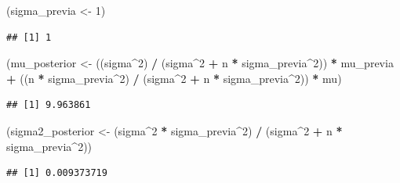 \documentclass[
  12pt,
]{book}
\newenvironment{Shaded}{\begin{snugshade}}{\end{snugshade}}
\newcommand{\DecValTok}[1]{\textcolor[rgb]{0.00,0.00,0.81}{#1}}
\newcommand{\NormalTok}[1]{#1}
\newcommand{\OperatorTok}[1]{\textcolor[rgb]{0.81,0.36,0.00}{\textbf{#1}}}
\newcommand{\StringTok}[1]{\textcolor[rgb]{0.31,0.60,0.02}{#1}}
\begin{document}
\begin{Shaded}
\begin{Highlighting}[]
\NormalTok{(sigma\_previa \textless{}{-}}\StringTok{ }\DecValTok{1}\NormalTok{)}
\end{Highlighting}
\end{Shaded}

\begin{verbatim}
## [1] 1
\end{verbatim}

\begin{Shaded}
\begin{Highlighting}[]
\NormalTok{(mu\_posterior \textless{}{-}}\StringTok{ }\NormalTok{((sigma}\OperatorTok{\^{}}\DecValTok{2}\NormalTok{) }\OperatorTok{/}\StringTok{ }\NormalTok{(sigma}\OperatorTok{\^{}}\DecValTok{2} \OperatorTok{+}\StringTok{ }\NormalTok{n }\OperatorTok{*}\StringTok{ }\NormalTok{sigma\_previa}\OperatorTok{\^{}}\DecValTok{2}\NormalTok{)) }\OperatorTok{*}\StringTok{ }\NormalTok{mu\_previa }\OperatorTok{+}\StringTok{ }\NormalTok{((n }\OperatorTok{*}\StringTok{ }\NormalTok{sigma\_previa}\OperatorTok{\^{}}\DecValTok{2}\NormalTok{) }\OperatorTok{/}\StringTok{ }\NormalTok{(sigma}\OperatorTok{\^{}}\DecValTok{2} \OperatorTok{+}\StringTok{ }\NormalTok{n }\OperatorTok{*}\StringTok{ }\NormalTok{sigma\_previa}\OperatorTok{\^{}}\DecValTok{2}\NormalTok{)) }\OperatorTok{*}\StringTok{ }\NormalTok{mu)}
\end{Highlighting}
\end{Shaded}

\begin{verbatim}
## [1] 9.963861
\end{verbatim}

\begin{Shaded}
\begin{Highlighting}[]
\NormalTok{(sigma2\_posterior \textless{}{-}}\StringTok{ }\NormalTok{(sigma}\OperatorTok{\^{}}\DecValTok{2} \OperatorTok{*}\StringTok{ }\NormalTok{sigma\_previa}\OperatorTok{\^{}}\DecValTok{2}\NormalTok{) }\OperatorTok{/}\StringTok{ }\NormalTok{(sigma}\OperatorTok{\^{}}\DecValTok{2} \OperatorTok{+}\StringTok{ }\NormalTok{n }\OperatorTok{*}\StringTok{ }\NormalTok{sigma\_previa}\OperatorTok{\^{}}\DecValTok{2}\NormalTok{))}
\end{Highlighting}
\end{Shaded}

\begin{verbatim}
## [1] 0.009373719
\end{verbatim}
\end{document}

